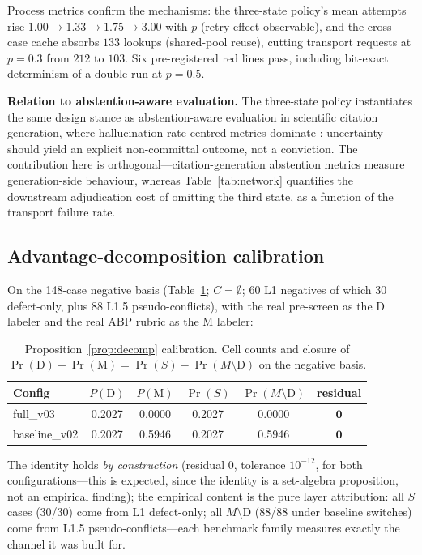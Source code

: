\documentclass[11pt]{article}
\newcommand{\dd}{\mathrm{D}}
\newcommand{\mm}{\mathrm{M}}
\newcommand{\cset}{C}
\begin{document}
Process metrics confirm the mechanisms: the three-state policy's mean
attempts rise $1.00\!\to\!1.33\!\to\!1.75\!\to\!3.00$ with $p$ (retry effect
observable), and the cross-case cache absorbs $133$ lookups (shared-pool
reuse), cutting transport requests at $p=0.3$ from $212$ to $103$. Six
pre-registered red lines pass, including bit-exact determinism of a
double-run at $p=0.5$.

\textbf{Relation to abstention-aware evaluation.} The three-state policy
instantiates the same design stance as abstention-aware evaluation in
scientific citation generation, where hallucination-rate-centred metrics
dominate \citep{saxena2024reasons}: uncertainty should yield an explicit
non-committal outcome, not a conviction. The contribution here is
orthogonal—citation-generation abstention metrics measure generation-side
behaviour, whereas Table~\ref{tab:network} quantifies the downstream
adjudication cost of omitting the third state, as a function of the
transport failure rate.

\subsection{Advantage-decomposition calibration}\label{sec:decomp}

On the 148-case negative basis (Table~\ref{tab:decomp}; $\cset=\emptyset$;
60 L1 negatives of which
30 defect-only, plus 88 L1.5 pseudo-conflicts), with the real pre-screen as
the $\dd$ labeler and the real ABP rubric as the $\mm$ labeler:

\begin{table}[t]
\centering\small
\caption{Proposition~\ref{prop:decomp} calibration. Cell counts and closure of
$\Pr(\dd)-\Pr(\mm)=\Pr(S)-\Pr(M{\setminus}\dd)$ on the negative basis.}
\label{tab:decomp}
\begin{tabular}{@{}lccccc@{}}
\toprule
Config & $P(\dd)$ & $P(\mm)$ & $\Pr(S)$ & $\Pr(M{\setminus}\dd)$ & residual \\
\midrule
full\_v03 & 0.2027 & 0.0000 & 0.2027 & 0.0000 & $\mathbf{0}$ \\
baseline\_v02 & 0.2027 & 0.5946 & 0.2027 & 0.5946 & $\mathbf{0}$ \\
\bottomrule
\end{tabular}
\end{table}

The identity holds \emph{by construction} (residual $0$, tolerance
$10^{-12}$, for both configurations—this is expected, since the identity is
a set-algebra proposition, not an empirical finding); the empirical content
is the pure layer attribution: all $S$ cases
(30/30) come from L1 defect-only; all $M{\setminus}\dd$ (88/88 under
baseline switches) come from L1.5 pseudo-conflicts—each benchmark family
measures exactly the channel it was built for.
\end{document}
